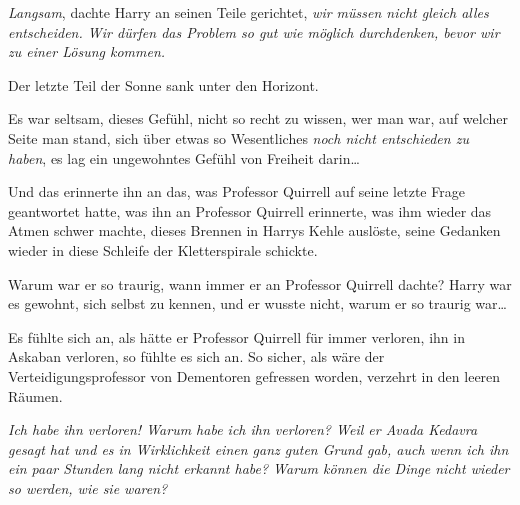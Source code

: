 \emph{Langsam}, dachte Harry an seinen Teile gerichtet, \emph{wir müssen nicht gleich alles entscheiden. Wir dürfen das Problem so gut wie möglich durchdenken, bevor wir zu einer Lösung kommen.}

Der letzte Teil der Sonne sank unter den Horizont.

Es war seltsam, dieses Gefühl, nicht so recht zu wissen, wer man war, auf welcher Seite man stand, sich über etwas so Wesentliches \emph{noch nicht entschieden zu haben}, es lag ein ungewohntes Gefühl von Freiheit darin…

Und das erinnerte ihn an das, was Professor Quirrell auf seine letzte Frage geantwortet hatte, was ihn an Professor Quirrell erinnerte, was ihm wieder das Atmen schwer machte, dieses Brennen in Harrys Kehle auslöste, seine Gedanken wieder in diese Schleife der Kletterspirale schickte.

Warum war er so traurig, wann immer er an Professor Quirrell dachte? Harry war es gewohnt, sich selbst zu kennen, und er wusste nicht, warum er so traurig war…

Es fühlte sich an, als hätte er Professor Quirrell für immer verloren, ihn in Askaban verloren, so fühlte es sich an. So sicher, als wäre der Verteidigungsprofessor von Dementoren gefressen worden, verzehrt in den leeren Räumen.

\emph{Ich habe ihn verloren! Warum habe ich ihn verloren? Weil er Avada Kedavra gesagt hat und es in Wirklichkeit einen ganz guten Grund gab, auch wenn ich ihn ein paar Stunden lang nicht erkannt habe? Warum können die Dinge nicht wieder so werden, wie sie waren?}

